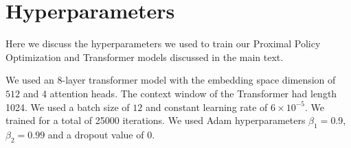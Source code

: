 
\section{Hyperparameters\label{app:hyperparameters}}

Here we discuss the hyperparameters we used to train our Proximal Policy Optimization and Transformer models discussed in the main text. 


We used an 8-layer transformer model with the embedding space dimension of $512$ and 4 attention heads. The context window of the Transformer had length 1024. We used a batch size of $12$ and constant learning rate of $6 \times 10^{-5}$. We trained for a total of 25000 iterations. We used Adam hyperparameters $\beta_1 = 0.9$, $\beta_2 = 0.99$ and a dropout value of $0$.